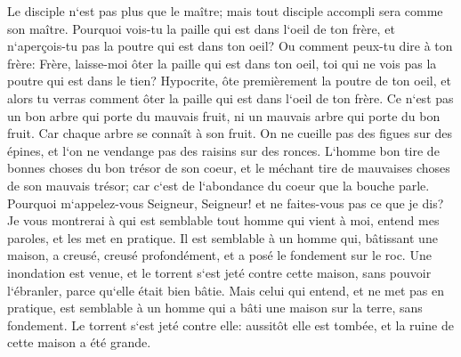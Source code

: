 \verse Le disciple n`est pas plus que le maître; mais tout disciple accompli sera comme son maître. 
\verse Pourquoi vois-tu la paille qui est dans l`oeil de ton frère, et n`aperçois-tu pas la poutre qui est dans ton oeil? 
\verse Ou comment peux-tu dire à ton frère: Frère, laisse-moi ôter la paille qui est dans ton oeil, toi qui ne vois pas la poutre qui est dans le tien? Hypocrite, ôte premièrement la poutre de ton oeil, et alors tu verras comment ôter la paille qui est dans l`oeil de ton frère. 
\verse Ce n`est pas un bon arbre qui porte du mauvais fruit, ni un mauvais arbre qui porte du bon fruit. 
\verse Car chaque arbre se connaît à son fruit. On ne cueille pas des figues sur des épines, et l`on ne vendange pas des raisins sur des ronces. 
\verse L`homme bon tire de bonnes choses du bon trésor de son coeur, et le méchant tire de mauvaises choses de son mauvais trésor; car c`est de l`abondance du coeur que la bouche parle. 
\verse Pourquoi m`appelez-vous Seigneur, Seigneur! et ne faites-vous pas ce que je dis? 
\verse Je vous montrerai à qui est semblable tout homme qui vient à moi, entend mes paroles, et les met en pratique. 
\verse Il est semblable à un homme qui, bâtissant une maison, a creusé, creusé profondément, et a posé le fondement sur le roc. Une inondation est venue, et le torrent s`est jeté contre cette maison, sans pouvoir l`ébranler, parce qu`elle était bien bâtie. 
\verse Mais celui qui entend, et ne met pas en pratique, est semblable à un homme qui a bâti une maison sur la terre, sans fondement. Le torrent s`est jeté contre elle: aussitôt elle est tombée, et la ruine de cette maison a été grande. 

